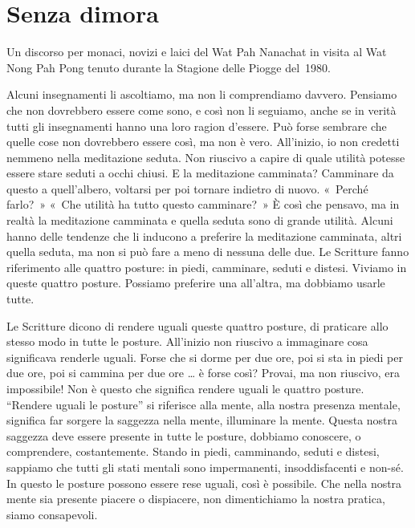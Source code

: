 \chapter{Senza dimora}

\begin{openingQuote}
  \centering

  Un discorso per monaci, novizi e laici del Wat Pah Nanachat in visita al Wat
  Nong Pah Pong tenuto durante la Stagione delle Piogge del~1980.
\end{openingQuote}

Alcuni insegnamenti li ascoltiamo, ma non li comprendiamo davvero.
Pensiamo che non dovrebbero essere come sono, e così non li seguiamo,
anche se in verità tutti gli insegnamenti hanno una loro ragion
d'essere. Può forse sembrare che quelle cose non dovrebbero essere così,
ma non è vero. All'inizio, io non credetti nemmeno nella meditazione
seduta. Non riuscivo a capire di quale utilità potesse essere stare
seduti a occhi chiusi. E la meditazione camminata? Camminare da questo a
quell'albero, voltarsi per poi tornare indietro di nuovo. «~Perché
farlo?~» «~Che utilità ha tutto questo camminare?~» È così che pensavo,
ma in realtà la meditazione camminata e quella seduta sono di grande
utilità. Alcuni hanno delle tendenze che li inducono a preferire la
meditazione camminata, altri quella seduta, ma non si può fare a meno di
nessuna delle due. Le Scritture fanno riferimento alle quattro posture:
in piedi, camminare, seduti e distesi. Viviamo in queste quattro
posture. Possiamo preferire una all'altra, ma dobbiamo usarle tutte.

Le Scritture dicono di rendere uguali queste quattro posture, di
praticare allo stesso modo in tutte le posture. All'inizio non riuscivo
a immaginare cosa significava renderle uguali. Forse che si dorme per
due ore, poi si sta in piedi per due ore, poi si cammina per due ore \ldots{}
è forse così? Provai, ma non riuscivo, era impossibile! Non è questo che
significa rendere uguali le quattro posture. ``Rendere uguali le
posture'' si riferisce alla mente, alla nostra presenza mentale,
significa far sorgere la saggezza nella mente, illuminare la mente.
Questa nostra saggezza deve essere presente in tutte le posture,
dobbiamo conoscere, o comprendere, costantemente. Stando in piedi,
camminando, seduti e distesi, sappiamo che tutti gli stati mentali sono
impermanenti, insoddisfacenti e non-sé. In questo le posture possono
essere rese uguali, così è possibile. Che nella nostra mente sia
presente piacere o dispiacere, non dimentichiamo la nostra pratica,
siamo consapevoli.

